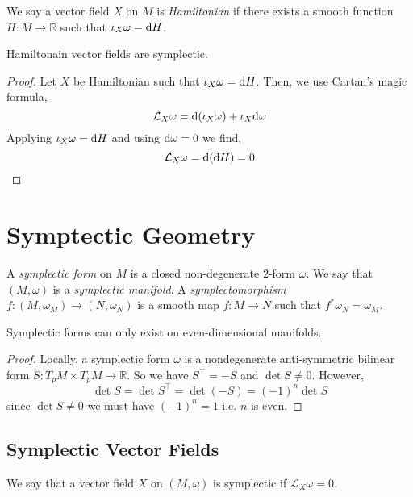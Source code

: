 \documentclass[12pt]{extarticle}
\renewcommand{\L}{\mathcal{L}}
\newcommand{\R}{\mathbb{R}}
\begin{document}
\begin{defn}
We say a vector field $X$ on $M$ is \textit{Hamiltonian} if there exists a smooth function $H : M \to \R$ such that $\iota_X \omega = \mathrm{d}{H}$. 
\end{defn}

\begin{lemma}
Hamiltonain vector fields are symplectic.
\end{lemma}

\begin{proof}
Let $X$ be Hamiltonian such that $\iota_X \omega = \mathrm{d}{H}$. Then, we use Cartan's magic formula,
\[ \L_X \omega = \d (\iota_X \omega) + \iota_X \d \omega \]
Applying $\iota_X \omega = \mathrm{d}{H}$ and using $\mathrm{d}{\omega} = 0$ we find,
\[ \L_X \omega = \d(\d{H}) = 0 \]
\end{proof}

\section{Symptectic Geometry}

\begin{definition}
A \textit{symplectic form} on $M$ is a closed non-degenerate $2$-form $\omega$. We say that $(M, \omega)$ is a \textit{symplectic manifold}. A \textit{symplectomorphism} $f : (M, \omega_M) \to (N, \omega_N)$ is a smooth map $f : M \to N$ such that $f^* \omega_N = \omega_M$. 
\end{definition}

\begin{lemma}
Symplectic forms can only exist on even-dimensional manifolds. 
\end{lemma}

\begin{proof}
Locally, a symplectic form $\omega$ is a nondegenerate anti-symmetric bilinear form $S : T_p M \times T_p M \to \R$. So we have $S^\top = - S$ and $\det{S} \neq 0$. However, \[ \det{S} = \det{S^\top} = \det{(- S)} = (-1)^n \det{S} \]
since $\det{S} \neq 0$ we must have $(-1)^n = 1$ i.e. $n$ is even.
\end{proof}

\subsection{Symplectic Vector Fields}

\begin{definition}
We say that a vector field $X$ on $(M, \omega)$ is symplectic if $\L_X \omega = 0$.
\end{definition}
\end{document}
